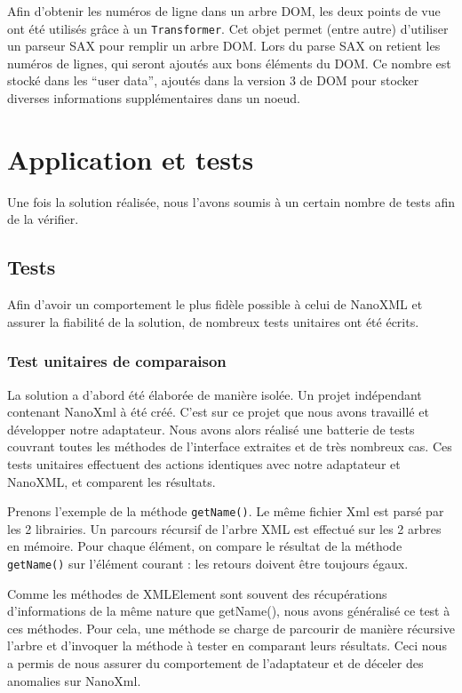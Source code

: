 Afin d'obtenir les numéros de ligne dans un arbre DOM, les deux points de vue ont été utilisés grâce à un \verb|Transformer|.
Cet objet permet (entre autre) d'utiliser un parseur SAX pour remplir un arbre DOM.
Lors du parse SAX on retient les numéros de lignes, qui seront ajoutés aux bons éléments du DOM.
Ce nombre est stocké dans les ``user data'', ajoutés dans la version 3  de DOM pour stocker diverses informations supplémentaires dans un noeud.

\section{Application et tests}
Une fois la solution réalisée, nous l'avons soumis à un certain nombre de tests afin de la vérifier.
\subsection{Tests}
Afin d'avoir un comportement le plus fidèle possible à celui de NanoXML et assurer la fiabilité de la solution, de nombreux tests unitaires ont été écrits.
\subsubsection{Test unitaires de comparaison}
La solution a d'abord été élaborée de manière isolée.
Un projet indépendant contenant NanoXml à été créé. 
C'est sur ce projet que nous avons travaillé et développer notre adaptateur.
Nous avons alors réalisé une batterie de tests couvrant toutes les méthodes de l'interface extraites et de très nombreux cas.
Ces tests unitaires effectuent des actions identiques avec notre adaptateur et NanoXML, et comparent les résultats.

Prenons l'exemple de la méthode \verb|getName()|. Le même fichier Xml est parsé par les 2 librairies.
Un parcours récursif de l'arbre XML est effectué sur les 2 arbres en mémoire.
Pour chaque élément, on compare le résultat de la méthode \verb|getName()| sur l'élément courant : les retours doivent être toujours égaux.

Comme les méthodes de XMLElement sont souvent des récupérations d'informations de la même nature que getName(), nous avons généralisé ce test à ces méthodes.
Pour cela, une méthode se charge de parcourir de manière récursive l'arbre et d'invoquer la méthode à tester en comparant leurs résultats.
Ceci nous a permis de nous assurer du comportement de l'adaptateur et de déceler des anomalies sur NanoXml.

